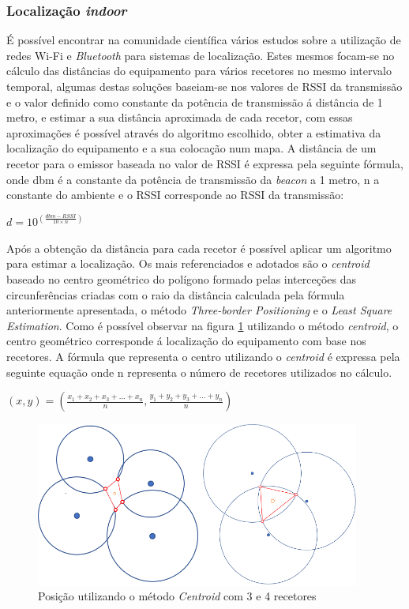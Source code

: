 \subsubsection{Localização \textit{indoor}} \label{indoor}
\par
É possível encontrar na comunidade científica vários estudos sobre a utilização de redes Wi-Fi e \textit{Bluetooth} para sistemas de localização. Estes mesmos focam-se no cálculo das distâncias do equipamento para vários recetores no mesmo intervalo temporal, algumas destas soluções baseiam-se nos valores de RSSI da transmissão e o valor definido como constante da potência de transmissão á distância de 1 metro, e estimar a sua distância aproximada de cada recetor, com essas aproximações é possível através do algoritmo escolhido\cite{Wang2013}, obter a estimativa da localização do equipamento e a sua colocação num mapa.
A distância de um recetor para o emissor baseada no valor de RSSI é expressa pela seguinte fórmula, onde dbm é a constante da potência de transmissão da \textit{beacon} a 1 metro, n a constante do ambiente e o RSSI corresponde ao RSSI da transmissão:
\par
\begin{center}
$d=10^(\frac{dbm-RSSI}{10 \times n})$
\end{center}

\par
Após a obtenção da distância para cada recetor é possível aplicar um algoritmo para estimar a localização. Os mais referenciados e adotados são o \textit{centroid} baseado no centro geométrico do polígono formado pelas interceções das circunferências criadas com o raio da distância calculada pela fórmula anteriormente apresentada, o método \textit{Three-border Positioning} e o \textit{Least Square Estimation}.
Como é possível observar na figura \ref{centroid} utilizando o método \textit{centroid}, o centro geométrico corresponde á localização do equipamento com base nos recetores. A fórmula que representa o centro utilizando o \textit{centroid} é expressa pela seguinte equação onde n representa o número de recetores utilizados no cálculo.
\par
\begin{center}
$ (x,y)= (\frac{x_{1}+x_{2}+x_{3}+...+x_{n}}{n},\frac{y_{1}+y_{2}+y_{3}+...+y_{n}}{n})$
\end{center}

\begin{figure}[htb]
\centering
\includegraphics[width=0.95\textwidth]{images/centroid3.png}
\caption{Posição utilizando o método \textit{Centroid} com 3 e 4 recetores}\label{centroid}
\end{figure}

